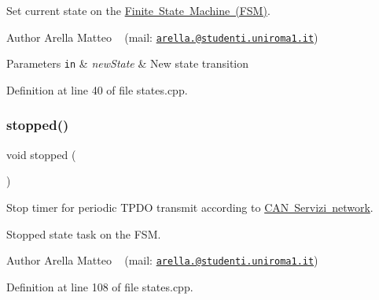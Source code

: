 Set current state on the \mbox{\hyperlink{_f_s_m_page}{Finite State Machine (F\+SM)}}. 

\begin{DoxyAuthor}{Author}
Arella Matteo ~\newline
 (mail\+: \href{mailto:arella.1646983@studenti.uniroma1.it}{\tt arella.@studenti.\+uniroma1.\+it})
\end{DoxyAuthor}

\begin{DoxyParams}[1]{Parameters}
\mbox{\tt in}  & {\em new\+State} & New state transition \\
\hline
\end{DoxyParams}


Definition at line 40 of file states.\+cpp.

\mbox{\label{group___c_a_nopen___f_s_m__module_gad134c6ce7186d3f2e9cb314839fd63ad}} 
\subsubsection{\texorpdfstring{stopped()}{stopped()}}
{\footnotesize\ttfamily void stopped (\begin{DoxyParamCaption}{ }\end{DoxyParamCaption})}



Stop timer for periodic T\+P\+DO transmit according to \mbox{\hyperlink{_c_a_n_network_page}{C\+AN Servizi network}}. 

Stopped state task on the F\+SM.

\begin{DoxyAuthor}{Author}
Arella Matteo ~\newline
 (mail\+: \href{mailto:arella.1646983@studenti.uniroma1.it}{\tt arella.@studenti.\+uniroma1.\+it}) 
\end{DoxyAuthor}


Definition at line 108 of file states.\+cpp.

